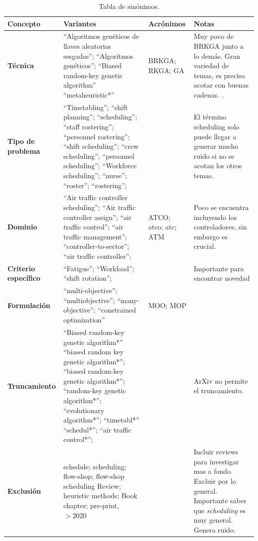 \pagestyle{UPM_memoir_landscape}
\begin{landscape}

  \begin{table}[ht!]
    \centering
    \def\arraystretch{2.2}
    \caption{Tabla de sinónimos.}
    \begin{tabularx}{\linewidth}{W{0.45}W{1.95}W{0.4}W{1.2}}
      \toprule
      \bfseries Concepto & \bfseries Variantes  &  Acrónimos & Notas \\ \hline
      \bfseries Técnica &
      ``Algoritmos genéticos de llaves aleatorias sesgadas'';
      ``Algoritmos genéticos'';
      ``Biased random-key genetic algorithm''
      ``metaheuristic*''
      & BRKGA; RKGA; GA &
      Muy poco de BRKGA junto a lo demás. Gran variedad de temas, es preciso acotar con buenas cadenas. .
      \\
      \bfseries Tipo de problema & ``Timetabling'';
      ``shift planning'';
      ``scheduling'';
      ``staff rostering'';
      ``personnel rostering'';
      ``shift scheduling'';
      ``crew scheduling'';
      ``personnel scheduling'';
      ``Workforce scheduling'';
      ``nurse'';
      ``roster'';
      ``rostering'';
      & & %
      El término scheduling solo puede llegar a generar mucho ruido si no se acotan los otros temas. \\
      \bfseries Dominio &
      ``Air traffic controller scheduling'';
      ``Air traffic controller assign'';
      ``air traffic control'';
      ``air traffic management'';
      ``controller-to-sector'';
      ``air traffic controller'';
      & ATCO; atco; atc; ATM
      & %
      Poco se encuentra incluyendo los controladores, sin embargo es crucial.
      \\
      \bfseries Criterio específico &
      ``Fatigue'';
      ``Workload'';
      ``shift rotation'';
      & & %
      Importante para encontrar novedad
      \\
      \bfseries Formulación &
      ``multi-objective'';
      ``multiobjective'';
      ``many-objective'';
      ``constrained optimization''
      & MOO; MOP
      & %
      \\
      \bfseries Truncamiento &
      ``Biased random-key genetic algorithm*''
      ``biased random key genetic algorithm*'';
      ``biased random-key genetic algorithm*'';
      ``random-key genetic algorithm*'';
      ``evolutionary algorithm*'';
      ``timetabl*''
      ``schedul*'';
      ``air traffic control*'';
      & &%
      ArXiv no permite el truncamiento.
      \\
      \bfseries Exclusión &
      schedule; scheduling;
      flow-shop;
      flow-shop scheduling
      Review; heuristic methods; Book chapter; pre-print, $>2020$
      & & %
      Incluir reviews para investigar mas a fondo. Excluir por lo general.
      Importante saber que \textit{scheduling} es muy general. Genera ruido.
      \\
      \bottomrule
    \end{tabularx}
  \end{table}


\end{landscape}
